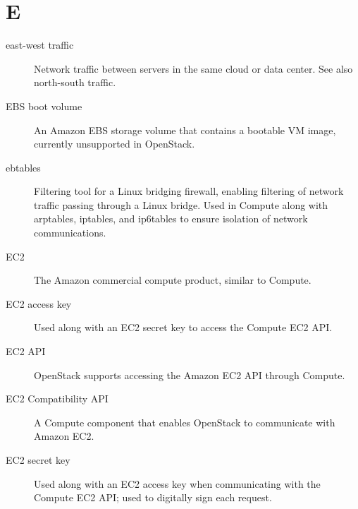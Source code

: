 \documentclass[letterpaper,10pt,english]{sphinxmanual}
\begin{document}
\section{E}
\label{_source/glossary:e}\begin{description}
\item[{east-west traffic}] \leavevmode{}\label{_source/glossary:term-east-west-traffic}
Network traffic between servers in the same cloud or data center.
See also north-south traffic.

\item[{EBS boot volume}] \leavevmode{}\label{_source/glossary:term-ebs-boot-volume}
An Amazon EBS storage volume that contains a bootable VM image,
currently unsupported in OpenStack.

\item[{ebtables}] \leavevmode{}\label{_source/glossary:term-ebtables}
Filtering tool for a Linux bridging firewall, enabling
filtering of network traffic passing through a Linux bridge.
Used in Compute along with arptables, iptables, and ip6tables
to ensure isolation of network communications.

\item[{EC2}] \leavevmode{}\label{_source/glossary:term-ec2}
The Amazon commercial compute product, similar to
Compute.

\item[{EC2 access key}] \leavevmode{}\label{_source/glossary:term-ec2-access-key}
Used along with an EC2 secret key to access the Compute EC2
API.

\item[{EC2 API}] \leavevmode{}\label{_source/glossary:term-ec2-api}
OpenStack supports accessing the Amazon EC2 API through
Compute.

\item[{EC2 Compatibility API}] \leavevmode{}\label{_source/glossary:term-ec2-compatibility-api}
A Compute component that enables OpenStack to communicate with
Amazon EC2.

\item[{EC2 secret key}] \leavevmode{}\label{_source/glossary:term-ec2-secret-key}
Used along with an EC2 access key when communicating with the
Compute EC2 API; used to digitally sign each request.


\end{description}
\end{document}
